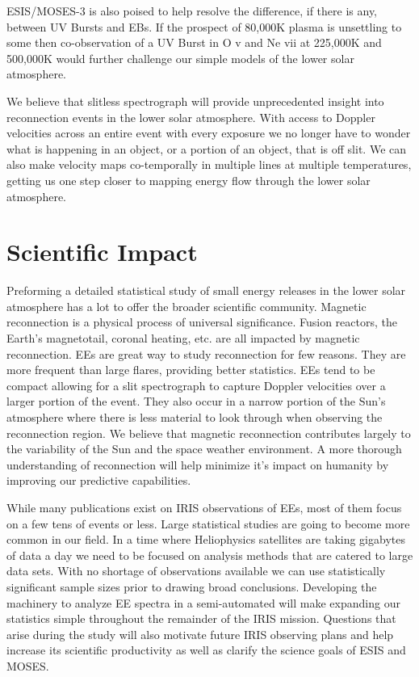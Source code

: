 \documentclass[]{aastex6}
\begin{document}
	ESIS/MOSES-3 is also poised to help resolve the difference, if there is any, between UV Bursts and EBs.  If the prospect of 80,000K plasma is unsettling to some \citep{Judge2015} then co-observation of a UV Burst in O {\sc v} and Ne {\sc vii} at 225,000K and 500,000K would further challenge our simple models of the lower solar atmosphere.
	
	We believe that slitless spectrograph will provide unprecedented insight into reconnection events in the lower solar atmosphere. With access to Doppler velocities across an entire event with every exposure we no longer have to wonder what is happening in an object, or a portion of an object, that is off slit.  We can also make velocity maps co-temporally in multiple lines at multiple temperatures, getting us one step closer to mapping energy flow through the lower solar atmosphere.


\section{Scientific Impact}
%
Preforming a detailed statistical study of small energy releases in the lower solar atmosphere has a lot to offer the broader scientific community. Magnetic reconnection is a physical process of universal significance. Fusion reactors, the Earth's magnetotail, coronal heating, etc. are all impacted by magnetic reconnection. EEs are great way to study reconnection for few reasons. They are more frequent than large flares, providing better statistics.  EEs tend to be compact allowing for a slit spectrograph to capture Doppler velocities over a larger portion of the event.  They also occur in a narrow portion of the Sun's atmosphere where there is less material to look through when observing the reconnection region.  We believe that magnetic reconnection contributes largely to the variability of the Sun and the space weather environment.  A more thorough understanding of reconnection will help minimize it's impact on humanity by improving our predictive capabilities.

While many publications exist on IRIS observations of EEs, most of them focus on a few tens of events or less. Large statistical studies are going to become more common in our field.  In a time where Heliophysics satellites are taking gigabytes of data a day we need to be focused on analysis methods that are catered to large data sets.  With no shortage of observations available we can use statistically significant sample sizes prior to drawing broad conclusions. Developing the machinery to analyze EE spectra in a semi-automated will make expanding our statistics simple throughout the remainder of the IRIS mission.  Questions that arise during the study will also motivate future IRIS observing plans and help increase its scientific productivity as well as clarify the science goals of ESIS and MOSES.
\end{document}
